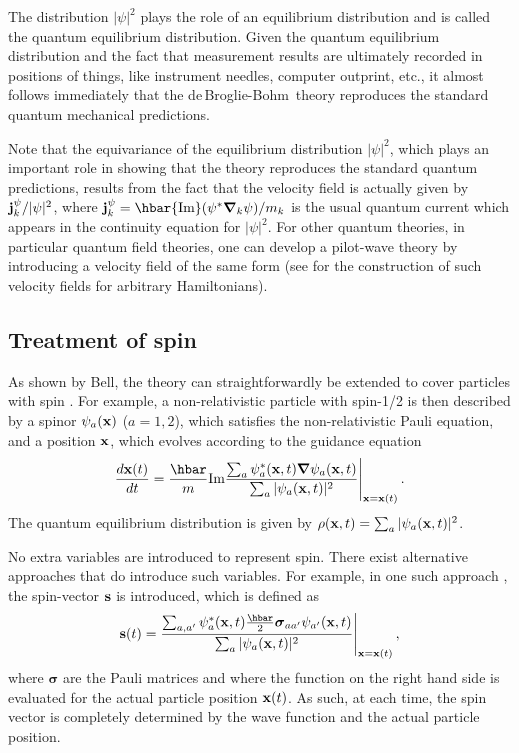 \documentclass[11pt]{article}
\def\fr{\frac}
\newcommand{\dbb}{de$\,$Broglie-Bohm}
\begin{document}
The distribution $|\psi|^2$ plays the role of an equilibrium distribution and is called the quantum equilibrium distribution. Given the quantum equilibrium distribution and the fact that measurement results are ultimately recorded in positions of things, like instrument needles, computer outprint, etc., it almost follows immediately that the \dbb\ theory reproduces the standard quantum mechanical predictions.

Note that the equivariance of the equilibrium distribution $|\psi|^2$, which plays an important role in showing that the theory reproduces the standard quantum predictions, results from the fact that the velocity field is actually given by $ {\bf j}^\psi_k/|\psi|^2$, where ${\bf j}^\psi_k = \hbar {\textrm{Im}} (\psi^* {\boldsymbol {\nabla}}_k \psi) / m_k$ is the usual quantum current which appears in the continuity equation for $|\psi|^2$. For other quantum theories, in particular quantum field theories, one can develop a pilot-wave theory by introducing a velocity field of the same form (see \cite{struyve09a} for the construction of such velocity fields for arbitrary Hamiltonians). 


\subsection{Treatment of spin}\label{spin}
As shown by Bell, the theory can straightforwardly be extended to cover particles with spin \cite{bell66,bell71}. For example, a non-relativistic particle with spin-1/2 is then described by a spinor $\psi_a({\bf x})$ ($a=1,2$), which satisfies the non-relativistic Pauli equation, and a position ${\bf x}$, which evolves according to the guidance equation
\begin{equation}
\fr{d {\bf x}(t)}{dt} = \frac{\hbar}{m} {\textrm{Im}} \frac{ \sum_a \psi^*_a ({\bf x},t){\boldsymbol {\nabla}} \psi_a ({\bf x},t)}{\sum_a |\psi_a({\bf x},t)|^2} \Bigg|_{{\bf x}={\bf x}(t)}  \,.
\label{3}
\end{equation}
The quantum equilibrium distribution is given by $\rho({\bf x},t) = \sum_a |\psi_a({\bf x},t)|^2$.

No extra variables are introduced to represent spin. There exist alternative approaches that do introduce such variables. For example, in one such approach \cite{dewdney86}, the spin-vector ${\bf s}$ is introduced, which is defined as
\begin{equation}
{\bf s}(t) = \frac{\sum_{a,a'}\psi^*_a({\bf x},t) \frac{\hbar }{2}{\boldsymbol \sigma}_{aa'} \psi_{a'}({\bf x},t)}{\sum_a |\psi_a({\bf x},t)|^2} \Bigg|_{{\bf x}={\bf x}(t)} \,,
\label{4}
\end{equation}
where ${\boldsymbol \sigma}$ are the Pauli matrices and where the function on the right hand side is evaluated for the actual particle position ${\bf x}(t)$. As such, at each time, the spin vector is completely determined by the wave function and the actual particle position. 
\end{document}
